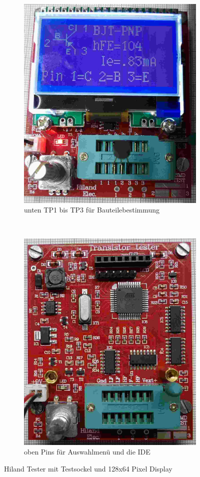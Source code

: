 \begin{figure}[H]
  \begin{subfigure}[b]{.47\textwidth}	%
    \centering
    \includegraphics[width=.875\textwidth]{../PNG/Hi_u.jpg}  %
    \caption{unten TP1 bis TP3 für Bauteilebestimmung}
  \end{subfigure}
  ~
  \begin{subfigure}[b]{.5\textwidth}	%
    \centering
    \includegraphics[width=.756\textwidth]{../PNG/Hi_o.jpg}  %
    \caption{oben Pins für Auswahlmenü und die IDE}
  \end{subfigure}
  \caption{Hiland Tester mit Testsockel und 128x64 Pixel Display}
  \label{fig:Hiland}
\end{figure}

